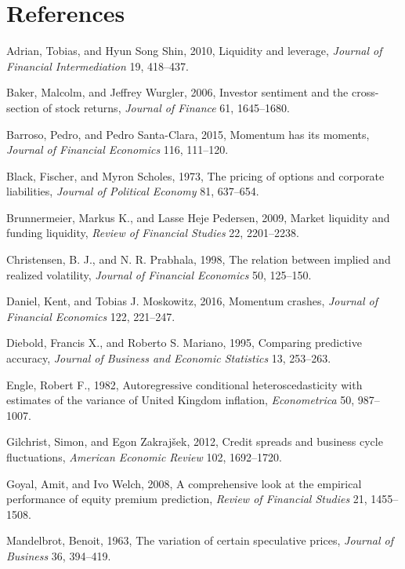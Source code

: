 \documentclass[10pt,twocolumn,letterpaper]{article}
\begin{document}
\section*{References}
\footnotesize
\begin{list}{}{\setlength{\leftmargin}{1.4em}\setlength{\itemindent}{-1.4em}\setlength{\itemsep}{1.5pt}\setlength{\parsep}{0pt}}
\item Adrian, Tobias, and Hyun Song Shin, 2010, Liquidity and leverage, \textit{Journal of Financial Intermediation} 19, 418--437.
\item Baker, Malcolm, and Jeffrey Wurgler, 2006, Investor sentiment and the cross-section of stock returns, \textit{Journal of Finance} 61, 1645--1680.
\item Barroso, Pedro, and Pedro Santa-Clara, 2015, Momentum has its moments, \textit{Journal of Financial Economics} 116, 111--120.
\item Black, Fischer, and Myron Scholes, 1973, The pricing of options and corporate liabilities, \textit{Journal of Political Economy} 81, 637--654.
\item Brunnermeier, Markus K., and Lasse Heje Pedersen, 2009, Market liquidity and funding liquidity, \textit{Review of Financial Studies} 22, 2201--2238.
\item Christensen, B. J., and N. R. Prabhala, 1998, The relation between implied and realized volatility, \textit{Journal of Financial Economics} 50, 125--150.
\item Daniel, Kent, and Tobias J. Moskowitz, 2016, Momentum crashes, \textit{Journal of Financial Economics} 122, 221--247.
\item Diebold, Francis X., and Roberto S. Mariano, 1995, Comparing predictive accuracy, \textit{Journal of Business and Economic Statistics} 13, 253--263.
\item Engle, Robert F., 1982, Autoregressive conditional heteroscedasticity with estimates of the variance of United Kingdom inflation, \textit{Econometrica} 50, 987--1007.
\item Gilchrist, Simon, and Egon Zakrajšek, 2012, Credit spreads and business cycle fluctuations, \textit{American Economic Review} 102, 1692--1720.
\item Goyal, Amit, and Ivo Welch, 2008, A comprehensive look at the empirical performance of equity premium prediction, \textit{Review of Financial Studies} 21, 1455--1508.
\item Mandelbrot, Benoit, 1963, The variation of certain speculative prices, \textit{Journal of Business} 36, 394--419.

\end{list}
\end{document}

